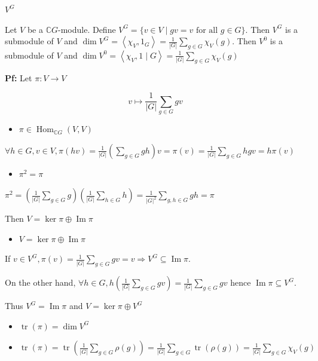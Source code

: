 \documentclass[11pt, a4paper]{report}
\begin{document}
\begin{lemma}
$V^{G}$

Let $V$ be a $\mathbb{C}G$-module. Define $V^{G}=\{v \in V \mid g v=v \text{ for all } g \in G\}$.
Then $V^{G}$ is a submodule of $V$ and $\operatorname{dim} V^{G}=\left\langle \chi_{V}, 1_{G}\right\rangle=\frac{1}{|G|} \sum_{g \in G} \chi_{V}(g)$.
Then $V^{0}$ is a submodule of $V$ and $\operatorname{dim} V^{0}=\left\langle \chi_{V}, 1 \mid G\right\rangle=\frac{1}{|G|} \sum_{g \in G} \chi_{V}(g)$

\textbf{Pf:}
Let $\pi: V \rightarrow V$

\[
v \mapsto \frac{1}{|G|} \sum_{g \in G} g v
\]

\begin{itemize}
\item $\pi \in \operatorname{Hom}_{\mathbb{C} G}(V, V)$
\end{itemize}

$\forall h \in G, v \in V, \pi(h v)=\frac{1}{|G|}\left(\sum_{g \in G} g h\right) v=\pi(v)=\frac{1}{|G|} \sum_{g \in G} h g v=h \pi(v)$

\begin{itemize}
\item $\pi^{2}=\pi$
\end{itemize}

$\pi^{2}=\left(\frac{1}{|G|} \sum_{g \in G} g\right)\left(\frac{1}{|G|} \sum_{h \in G} h\right)=\frac{1}{|G|^{2}} \sum_{g, h \in G} g h=\pi$

Then $V=\operatorname{ker} \pi \oplus \operatorname{Im} \pi$

\begin{itemize}
\item $V=\operatorname{ker} \pi \oplus \operatorname{Im} \pi$
\end{itemize}

If $v \in V^{G}, \pi(v)=\frac{1}{|G|} \sum_{g \in G} g v=v \Rightarrow V^{G} \subseteq \operatorname{Im} \pi$.

On the other hand, $\forall h \in G, h\left(\frac{1}{|G|} \sum_{g \in G} g v\right)=\frac{1}{|G|} \sum_{g \in G} g v$ hence $\operatorname{Im} \pi \subseteq V^{G}$.

Thus $V^{G}=\operatorname{Im} \pi$ and $V=\operatorname{ker} \pi \oplus V^{G}$

\begin{itemize}
\item $\operatorname{tr}(\pi)=\operatorname{dim} V^{G}$
\item $\operatorname{tr}(\pi)=\operatorname{tr}\left(\frac{1}{|G|} \sum_{g \in G} \rho(g)\right)=\frac{1}{|G|} \sum_{g \in G} \operatorname{tr}(\rho(g))=\frac{1}{|G|} \sum_{g \in G} \chi_{V}(g)$
\end{itemize}

\end{lemma}
\end{document}
